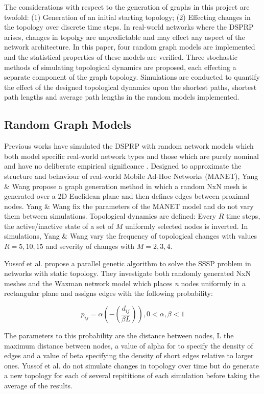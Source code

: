 \documentclass[
	a4paper, %
	10pt, %
	unnumberedsections, %
	twoside, %
]{LTJournalArticle}
\begin{document}
The considerations with respect to the generation of graphs in this project are twofold: (1) Generation of an initial starting topology; (2) Effecting changes in the topology over discrete time steps. In real-world networks where the DSPRP arises, changes in topolgy are unpredictable and may effect any aspect of the network architecture. In this paper, four random graph models are implemented and the statistical properties of these models are verified. Three stochastic methods of simulating topological dynamics are proposed, each effecting a separate component of the graph topology. Simulations are conducted to quantify the effect of the designed topological dynamics upon the shortest paths, shortest path lengths and average path lengths in the random models implemented. 

\subsection{Random Graph Models}

Previous works have simulated the DSPRP with random network models which both model specific real-world network types \cite{yang:10} and those which are purely nominal and have no deliberate empirical significance \cite{yussof:09} \cite{kumar:10} \cite{gonen:11}. Designed to approximate the structure and behaviour of real-world Mobile Ad-Hoc Networks (MANET), Yang \& Wang propose a graph generation method in which a random NxN mesh is generated over a 2D Euclidean plane and then defines edges between proximal nodes. Yang \& Wang fix the parameters of the MANET model and do not vary them between simulations. Topological dynamics are defined: Every \( R \) time steps, the active/inactive state of a set of \( M \) uniformly selected nodes is inverted. In simulations, Yang \& Wang vary the frequency of topological changes with values \( R = 5, 10, 15 \) and severity of changes with \( M = 2, 3, 4 \). 

Yussof et al. propose a parallel genetic algorithm to solve the SSSP problem in networks with static topology. They investigate both randomly generated  NxN meshes and the Waxman network model which places \emph{n} nodes uniformly in a rectangular plane and assigns edges with the following probability: 

\begin{equation}
	p_{ij} = \alpha(-(\frac{d_{ij}}{\beta{L}})), 0 < \alpha{,} \beta < 1 
	\label{eq:waxman}
\end{equation}

The parameters to this probability are the distance between nodes, L the maximum distance between nodes, a value of alpha for to specify the density of edges and a value of beta specifying the density of short edges relative to larger ones. Yussof et al. do not simulate changes in topology over time but do generate a new topology for each of several repititions of each simulation before taking the average of the results. \\
\end{document}

